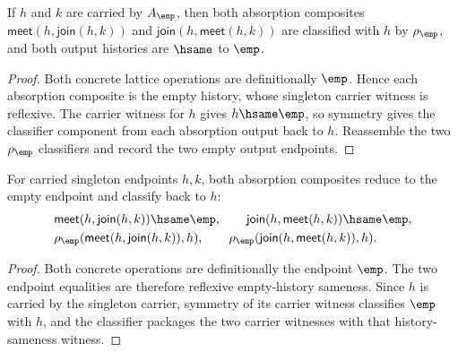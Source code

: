 \begin{theorem}
\label{thm:lattice-singleton-meet-join-absorption-classifier}
If $h$ and $k$ are carried by $A_{\emp}$, then both absorption composites
$\mathsf{meet}(h,\mathsf{join}(h,k))$ and
$\mathsf{join}(h,\mathsf{meet}(h,k))$ are classified with $h$ by
$\rho_{\emp}$, and both output histories are $\hsame$ to $\emp$.
\end{theorem}
\begin{proof}
Both concrete lattice operations are definitionally $\emp$. Hence each
absorption composite is the empty history, whose singleton carrier witness is
reflexive. The carrier witness for $h$ gives $h\hsame\emp$, so symmetry gives
the classifier component from each absorption output back to $h$. Reassemble
the two $\rho_{\emp}$ classifiers and record the two empty output endpoints.
\end{proof}

\begin{theorem}
\label{thm:lattice-singleton-meet-join-absorption-empty-classified}
For carried singleton endpoints $h,k$, both absorption composites reduce to
the empty endpoint and classify back to $h$:
$$
\begin{aligned}
&\mathsf{meet}(h,\mathsf{join}(h,k))\hsame\emp,\qquad
\mathsf{join}(h,\mathsf{meet}(h,k))\hsame\emp,\\
&\rho_{\emp}(\mathsf{meet}(h,\mathsf{join}(h,k)),h),\qquad
\rho_{\emp}(\mathsf{join}(h,\mathsf{meet}(h,k)),h).
\end{aligned}
$$
\end{theorem}
\begin{proof}
Both concrete operations are definitionally the endpoint $\emp$. The two
endpoint equalities are therefore reflexive empty-history sameness. Since $h$
is carried by the singleton carrier, symmetry of its carrier witness classifies
$\emp$ with $h$, and the classifier packages the two carrier witnesses with
that history-sameness witness.
\end{proof}

